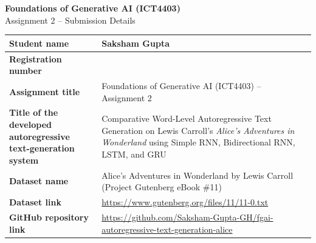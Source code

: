 \documentclass[11pt,letterpaper]{article}
\begin{document}
\begin{center}
  {\fontsize{16pt}{20pt}\selectfont \textbf{Foundations of Generative AI (ICT4403)}}\\[6pt]
  {\fontsize{13pt}{16pt}\selectfont Assignment 2 -- Submission Details}
\end{center}

\vspace{28pt}

\begin{center}
\renewcommand{\arraystretch}{1.65}
\fontsize{10.5pt}{14.5pt}\selectfont
\begin{tabularx}{\linewidth}{|>{\bfseries}p{2.35in}|>{\raggedright\arraybackslash}X|}
\hline
\rowcolor{tablealtbg}
Student name & Saksham Gupta \\ \hline
Registration number & 230911186 \\ \hline
\rowcolor{tablealtbg}
Assignment title & Foundations of Generative AI (ICT4403) -- Assignment 2 \\ \hline
Title of the developed autoregressive text-generation system & Comparative Word-Level Autoregressive Text Generation on Lewis Carroll's \textit{Alice's Adventures in Wonderland} using Simple RNN, Bidirectional RNN, LSTM, and GRU \\ \hline
\rowcolor{tablealtbg}
Dataset name & Alice's Adventures in Wonderland by Lewis Carroll (Project Gutenberg eBook \#11) \\ \hline
Dataset link & \url{https://www.gutenberg.org/files/11/11-0.txt} \\ \hline
\rowcolor{tablealtbg}
GitHub repository link & \url{https://github.com/Saksham-Gupta-GH/fgai-autoregressive-text-generation-alice} \\ \hline
\end{tabularx}
\end{center}
\end{document}
